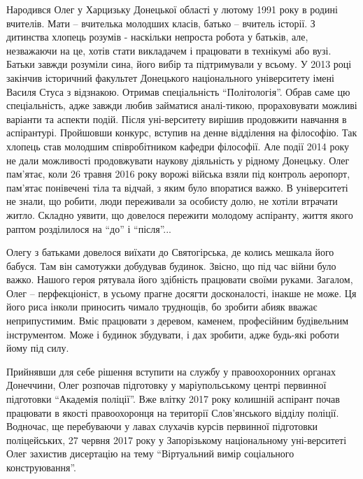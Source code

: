 Народився Олег у Харцизьку Донецької області у лютому 1991 року в родині
вчителів. Мати – вчителька молодших класів, батько – вчитель історії. З
дитинства хлопець розумів - наскільки непроста робота у батьків, але,
незважаючи на це, хотів стати викладачем і працювати в технікумі або вузі.
Батьки завжди розуміли сина, його вибір та підтримували у всьому. У 2013 році
закінчив історичний факультет Донецького національного університету імені
Василя Стуса з відзнакою. Отримав спеціальність \enquote{Політологія}. Обрав саме цю
спеціальність, адже завжди любив займатися аналі\hyp{}тикою, прораховувати можливі
варіанти та аспекти подій. Після уні\hyp{}верситету вирішив продовжити навчання в
аспірантурі. Пройшовши конкурс, вступив на денне відділення на філософію. Так
хлопець став молодшим співробітником кафедри філософії. Але події 2014 року не
дали можливості продовжувати наукову діяльність у рідному Донецьку. Олег
пам'ятає, коли 26 травня 2016 року ворожі війська взяли під контроль аеропорт,
пам'ятає понівечені тіла та відчай, з яким було впоратися важко. В університеті
не знали, що робити, люди переживали за особисту долю, не хотіли втрачати
житло. Складно уявити, що довелося пережити молодому аспіранту, життя якого
раптом розділилося на \enquote{до} і \enquote{після}...


Олегу з батьками довелося виїхати до Святогірська, де колись мешкала його
бабуся. Там він самотужки добудував будинок. Звісно, що під час війни було
важко. Нашого героя рятувала його здібність працювати своїми руками. Загалом,
Олег – перфекціоніст, в усьому прагне досягти досконалості, інакше не може. Ця
його риса інколи приносить чимало труднощів, бо зробити абияк вважає
неприпустимим. Вміє працювати з деревом, каменем, професійним будівельним
інструментом. Може і будинок збудувати, і дах зробити, адже будь-які роботи
йому під силу.


Прийнявши для себе рішення вступити на службу у правоохоронних органах
Донеччини, Олег розпочав підготовку у маріупольському центрі первинної
підготовки \enquote{Академія поліції}. Вже влітку 2017 року колишній аспірант
почав працювати в якості правоохоронця на території Слов'янського відділу
поліції.  Водночас, ще перебуваючи у лавах слухачів курсів первинної підготовки
поліцейських, 27 червня 2017 року у Запорізькому національному уні\hyp{}верситеті
Олег захистив дисертацію на тему \enquote{Віртуальний вимір соціального
конструювання}.

